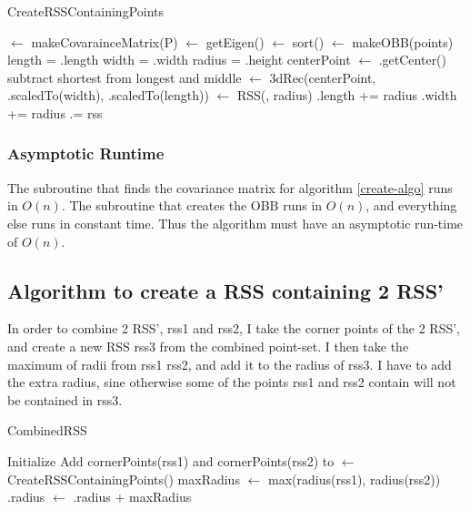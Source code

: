 \begin{algorithm}[H]
  \caption{CreateRSSContainingPoints}
  \label{create-algo}
   
  \dontprintsemicolon
  \covar $\gets$ makeCovarainceMatrix(P)\;
  \eigen $\gets$ getEigen(\covar) \;
  \eigen $\gets$ sort(\eigen) \;
  \obox $\gets$ makeOBB(points) \;
  length = \obox.length\;
  width = \obox.width\;
  radius = \obox.height \;
  centerPoint $\gets$ \obox.getCenter() \;
  subtract shortest from longest and middle
  \threedeeRec $\gets$ 3dRec(centerPoint, \eigen[1].scaledTo(width), \eigen[0].scaledTo(length)) \;
  \rss $\gets$ RSS(\threedeeRec, radius) \;
  \obox.length += radius \;
  \obox.width += radius \;
  \rss.\obox = \obox \;
  \return rss
\end{algorithm}

\subsubsection{Asymptotic Runtime}
The subroutine that finds the covariance matrix for algorithm \ref{create-algo} runs in $O(n)$. The subroutine that creates the OBB runs in $O(n)$, and everything else runs in constant time. Thus the algorithm must have an asymptotic run-time of $O(n)$.

\subsection{Algorithm to create a RSS containing 2 RSS'}
In order to combine  2 RSS', rss1 and rss2, I take the corner points of the 2 RSS', and create a new RSS rss3 from the combined point-set. I then take the maximum of radii from rss1 rss2, and add it to the radius of rss3. I have to add the extra radius, sine otherwise some of the points rss1 and rss2 contain will not be contained in rss3.

\begin{algorithm}[H]
  \caption{CombinedRSS}
  \label{combine-algo}
   
  \dontprintsemicolon
  Initialize \points \;
  Add cornerPoints(rss1) and cornerPoints(rss2) to \points \;
  \crss $\gets$ CreateRSSContainingPoints(\points) \;
  maxRadius $\gets$ max(radius(rss1), radius(rss2)) \;
  \crss.radius $\gets$ \crss.radius + maxRadius \;
  \return \crss \;
\end{algorithm}

